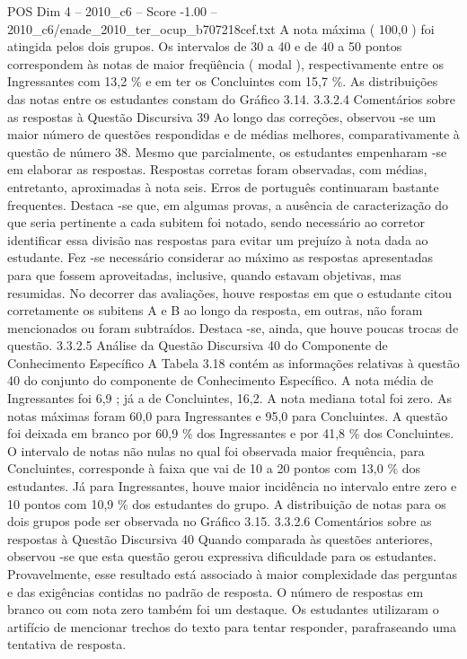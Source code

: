 \begin{textsample}{POS Dim 4 – 2010\_c6 – Score -1.00 – 2010\_c6/enade\_2010\_ter\_ocup\_b707218cef.txt}
A nota máxima ( 100,0 ) foi atingida pelos dois grupos.
Os intervalos de 30 a 40 e de 40 a 50 pontos correspondem às notas de maior freqüência ( modal ), respectivamente entre os Ingressantes com 13,2 \% e em ter os Concluintes com 15,7 \%.
As distribuições das notas entre os estudantes constam do Gráfico 3.14. 3.3.2.4 Comentários sobre as respostas à Questão Discursiva 39 Ao longo das correções, observou -se um maior número de questões respondidas e de médias melhores, comparativamente à questão de número 38.
Mesmo que parcialmente, os estudantes empenharam -se em elaborar as respostas.
Respostas corretas foram observadas, com médias, entretanto, aproximadas à nota seis.
Erros de português continuaram bastante frequentes.
Destaca -se que, em algumas provas, a ausência de caracterização do que seria pertinente a cada subitem foi notado, sendo necessário ao corretor identificar essa divisão nas respostas para evitar um prejuízo à nota dada ao estudante.
Fez -se necessário considerar ao máximo as respostas apresentadas para que fossem aproveitadas, inclusive, quando estavam objetivas, mas resumidas.
No decorrer das avaliações, houve respostas em que o estudante citou corretamente os subitens A e B ao longo da resposta, em outras, não foram mencionados ou foram subtraídos.
Destaca -se, ainda, que houve poucas trocas de questão. 3.3.2.5 Análise da Questão Discursiva 40 do Componente de Conhecimento Específico A Tabela 3.18 contém as informações relativas à questão 40 do conjunto do componente de Conhecimento Específico.
A nota média de Ingressantes foi 6,9 ; já a de Concluintes, 16,2.
A nota mediana total foi zero.
As notas máximas foram 60,0 para Ingressantes e 95,0 para Concluintes.
A questão foi deixada em branco por 60,9 \% dos Ingressantes e por 41,8 \% dos Concluintes.
O intervalo de notas não nulas no qual foi observada maior frequência, para Concluintes, corresponde à faixa que vai de 10 a 20 pontos com 13,0 \% dos estudantes.
Já para Ingressantes, houve maior incidência no intervalo entre zero e 10 pontos com 10,9 \% dos estudantes do grupo.
A distribuição de notas para os dois grupos pode ser observada no Gráfico 3.15. 3.3.2.6 Comentários sobre as respostas à Questão Discursiva 40 Quando comparada às questões anteriores, observou -se que esta questão gerou expressiva dificuldade para os estudantes.
Provavelmente, esse resultado está associado à maior complexidade das perguntas e das exigências contidas no padrão de resposta.
O número de respostas em branco ou com nota zero também foi um destaque.
Os estudantes utilizaram o artifício de mencionar trechos do texto para tentar responder, parafraseando uma tentativa de resposta.

\end{textsample}
